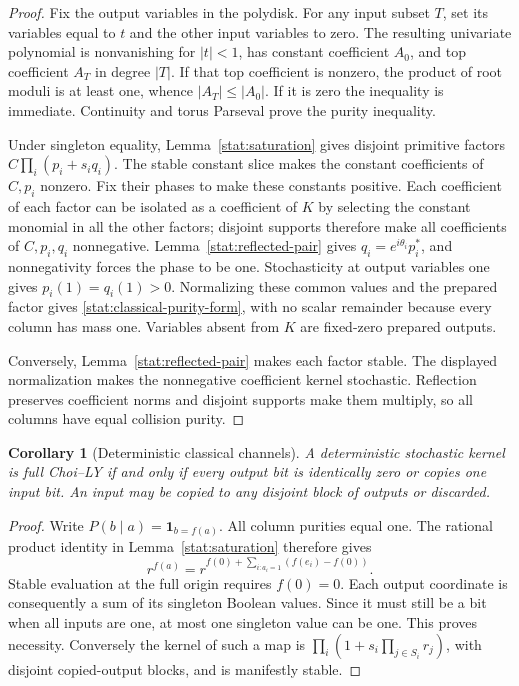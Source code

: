 \documentclass[reqno]{amsart}
\newtheorem{corollary}[theorem]{Corollary}
\theoremstyle{definition}
\theoremstyle{remark}
\begin{document}
\begin{proof}
Fix the output variables in the polydisk.  For any input subset
\(T\), set its variables equal to \(t\) and the other input
variables to zero.  The resulting univariate polynomial is
nonvanishing for \(|t|<1\), has constant coefficient \(A_0\),
and top coefficient \(A_T\) in degree \(|T|\).  If that top
coefficient is nonzero, the product of root moduli is at least
one, whence \(|A_T|\le|A_0|\).  If it is zero the inequality
is immediate.  Continuity and torus Parseval prove the purity
inequality.

Under singleton equality, Lemma~\ref{stat:saturation} gives
disjoint primitive factors \(C\prod_i(p_i+s_iq_i)\).
The stable constant slice makes the constant coefficients of
\(C,p_i\) nonzero.  Fix their phases to make these constants
positive.  Each coefficient of each factor can be isolated
as a coefficient of \(K\) by selecting the constant monomial
in all the other factors; disjoint supports therefore make
all coefficients of \(C,p_i,q_i\) nonnegative.
Lemma~\ref{stat:reflected-pair} gives
\(q_i=e^{i\theta_i}p_i^*\), and nonnegativity forces the
phase to be one.  Stochasticity at output variables one gives
\(p_i(1)=q_i(1)>0\).  Normalizing these common values and
the prepared factor gives \eqref{stat:classical-purity-form},
with no scalar remainder because every column has mass one.
Variables absent from \(K\) are fixed-zero prepared outputs.

Conversely, Lemma~\ref{stat:reflected-pair} makes each factor
stable.  The displayed normalization makes the nonnegative
coefficient kernel stochastic.  Reflection preserves
coefficient norms and disjoint supports make them multiply,
so all columns have equal collision purity.
\end{proof}

\begin{corollary}[Deterministic classical channels]
\label{stat:deterministic}
A deterministic stochastic kernel is full Choi--LY if and
only if every output bit is identically zero or copies one
input bit.  An input may be copied to any disjoint block of
outputs or discarded.
\end{corollary}

\begin{proof}
Write \(P(b\mid a)=\mathbf{1}_{b=f(a)}\).  All column
purities equal one.  The rational product identity in
Lemma~\ref{stat:saturation} therefore gives
\[
 r^{f(a)}=r^{f(0)+\sum_{i:a_i=1}(f(e_i)-f(0))}.
\]
Stable evaluation at the full origin requires \(f(0)=0\).
Each output coordinate is consequently a sum of its
singleton Boolean values.  Since it must still be a bit
when all inputs are one, at most one singleton value can
be one.  This proves necessity.  Conversely the kernel of
such a map is
\(\prod_i(1+s_i\prod_{j\in S_i}r_j)\), with disjoint
copied-output blocks, and is manifestly stable.
\end{proof}
\end{document}
